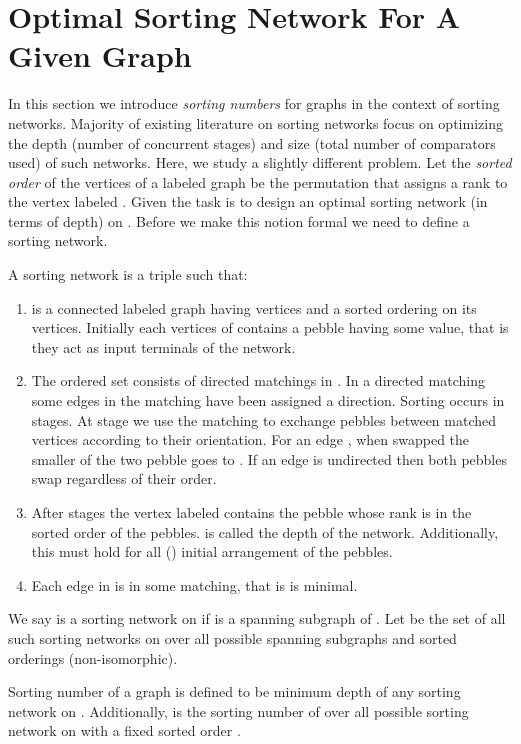 \documentclass[runningheads,a4paper]{llncs}
\begin{document}
\section{Optimal Sorting Network For A Given Graph}
In this section we introduce {\it sorting numbers} for graphs in the context of  sorting networks. Majority of existing literature on sorting networks focus on optimizing the depth (number of concurrent stages) and size (total number of comparators used) of such networks. Here, we study a slightly different problem. Let the \textit{sorted order} of the vertices of a labeled graph  be the permutation  that assigns a rank  to the vertex labeled .
Given  the task is to design an optimal sorting network (in terms of depth) on . Before we make this notion formal we need to define a sorting network.


\begin{definition}
	A sorting network is a triple  such that:
	\begin{enumerate}
		\item  is a connected labeled graph having  vertices and a sorted ordering  on its vertices. Initially each vertices of  contains a pebble having some value, that is they act as input terminals of the network.
		\item The ordered set  consists of directed matchings in . In a directed matching some edges in the matching have been assigned a direction. Sorting occurs in stages.
		At stage  we use the matching  to exchange pebbles between matched vertices according to their orientation. For an edge , when swapped the smaller of the two pebble goes to . If an edge is undirected then both pebbles swap regardless of their order.
		\item After  stages the vertex labeled  contains the pebble whose rank is  in the sorted order of the pebbles.   is called the depth of the network. Additionally, this must hold for all () initial arrangement of the pebbles.
		\item Each edge in  is in some matching, that is  is minimal. 
	\end{enumerate}
	
\end{definition}

\noindent We say   is a sorting network on  if  is a spanning subgraph of . Let  be the set of all such sorting networks on  over all possible spanning subgraphs and sorted orderings (non-isomorphic).


\begin{definition}
	Sorting number  of a graph  is defined to be minimum depth of any sorting network on . Additionally,  is the sorting number of  over all possible sorting network on  with a fixed sorted order .
\end{definition}
\end{document}
